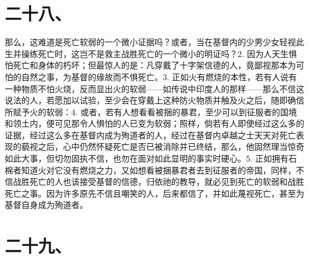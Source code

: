 
\section{二十八、}

那么，这难道是死亡软弱的一个微小证据吗？或者，当在基督内的少男少女轻视此生并操练死亡时，这岂不是救主战胜死亡的一个微小的明证吗？2. 因为人天生惧怕死亡和身体的朽坏；但最惊人的是：凡穿戴了十字架信德的人，竟鄙视那本为可怕的自然之事，为基督的缘故而不惧死亡。3. 正如火有燃烧的本性，若有人说有一种物质不怕火烧，反而显出火的软弱——如传说中印度人的那样——那么不信这说法的人，若愿加以试验，至少会在穿戴上这种防火物质并触及火之后，随即确信所赋予火的软弱：4. 或者，若有人想看看被捆的暴君，至少可以到征服者的国境和领土内，便可见那令人惧怕的人已变为软弱；照样，倘若有人即使经过这么多的证据，经过这么多在基督内成为殉道者的人，经过在基督内卓越之士天天对死亡表现的藐视之后，心中仍然怀疑死亡是否已被消除并已终结，那么，他固然理当惊奇如此大事，但切勿固执不信，也勿在面对如此显明的事实时硬心。5. 正如拥有石棉者知道火对它没有燃烧之力，又如想看被捆暴君者去到征服者的帝国，同样，不信战胜死亡的人也该接受基督的信德，归依祂的教导，就必见到死亡的软弱和战胜死亡之事。因为许多原先不信且嘲笑的人，后来都信了，并如此蔑视死亡，甚至为基督自身成为殉道者。\par


\section{二十九、}

